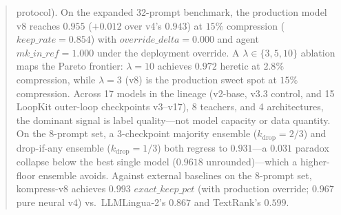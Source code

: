 \documentclass[10pt,letterpaper]{article}
\begin{document}
\begin{abstract}
protocol). On the expanded 32-prompt benchmark, the production model v8
reaches $0.955$ ($+0.012$ over v4's $0.943$) at $15\%$ compression
($\mathit{keep\_rate}{=}0.854$) with $\mathit{override\_delta}{=}0.000$ and
agent $\mathit{mk\_in\_ref}{=}1.000$ under the deployment override. A
$\lambda\in\{3,5,10\}$ ablation maps the Pareto frontier:
$\lambda{=}10$ achieves $0.972$ heretic at $2.8\%$ compression, while
$\lambda{=}3$ (v8) is the production sweet spot at $15\%$ compression. Across
17 models in the lineage (v2-base, v3.3 control, and 15 LoopKit outer-loop
checkpoints v3--v17), 8 teachers, and 4 architectures, the dominant signal is
label quality---not model capacity or data quantity. On the 8-prompt set, a
3-checkpoint majority ensemble ($k_{\mathrm{drop}}{=}2/3$) and drop-if-any
ensemble ($k_{\mathrm{drop}}{=}1/3$) both regress to $0.931$---a $0.031$
paradox collapse below the best single model ($0.9618$ unrounded)---which a
higher-floor ensemble avoids. Against external baselines on the 8-prompt set,
kompress-v8 achieves $0.993$ $\mathit{exact\_keep\_pct}$ (with production
override; $0.967$ pure neural v4) vs.\ LLMLingua-2's $0.867$ and TextRank's
$0.599$.
\end{abstract}











\end{document}
